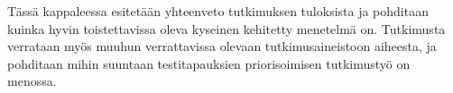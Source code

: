 Tässä kappaleessa esitetään yhteenveto tutkimuksen tuloksista ja pohditaan kuinka hyvin toistettavissa oleva kyseinen kehitetty menetelmä on.
Tutkimusta verrataan myös muuhun verrattavissa olevaan tutkimusaineistoon aiheesta, ja pohditaan mihin suuntaan testitapauksien priorisoimisen tutkimustyö on menossa.
